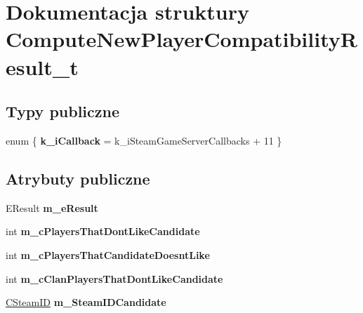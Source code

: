 \hypertarget{struct_compute_new_player_compatibility_result__t}{}\section{Dokumentacja struktury Compute\+New\+Player\+Compatibility\+Result\+\_\+t}
\label{struct_compute_new_player_compatibility_result__t}
\subsection*{Typy publiczne}
\begin{DoxyCompactItemize}
\item 
\mbox{\label{struct_compute_new_player_compatibility_result__t_ad5d6f8373740b9ca416fdda5463e75b5}} 
enum \{ {\bfseries k\+\_\+i\+Callback} = k\+\_\+i\+Steam\+Game\+Server\+Callbacks + 11
 \}
\end{DoxyCompactItemize}
\subsection*{Atrybuty publiczne}
\begin{DoxyCompactItemize}
\item 
\mbox{\label{struct_compute_new_player_compatibility_result__t_a5372994d1e83f4c0f6cfdf8540460c28}} 
E\+Result {\bfseries m\+\_\+e\+Result}
\item 
\mbox{\label{struct_compute_new_player_compatibility_result__t_a92ddef68c02bbca44089a55d3f377465}} 
int {\bfseries m\+\_\+c\+Players\+That\+Dont\+Like\+Candidate}
\item 
\mbox{\label{struct_compute_new_player_compatibility_result__t_a6cddd1f6d5a95d4c14d7da6d228d1d0f}} 
int {\bfseries m\+\_\+c\+Players\+That\+Candidate\+Doesnt\+Like}
\item 
\mbox{\label{struct_compute_new_player_compatibility_result__t_a591103bb5d6e1464a2461cb1277512b6}} 
int {\bfseries m\+\_\+c\+Clan\+Players\+That\+Dont\+Like\+Candidate}
\item 
\mbox{\label{struct_compute_new_player_compatibility_result__t_a10544387dc5fb054dd34f34cc11ceeef}} 
\hyperlink{class_c_steam_i_d}{C\+Steam\+ID} {\bfseries m\+\_\+\+Steam\+I\+D\+Candidate}
\end{DoxyCompactItemize}



